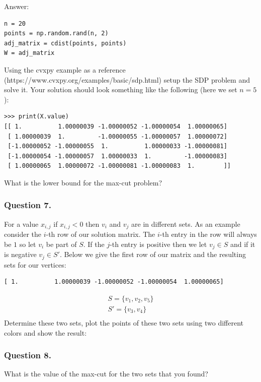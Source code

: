 \documentclass{article}
\begin{document}
Answer:
\begin{verbatim}
n = 20
points = np.random.rand(n, 2)
adj_matrix = cdist(points, points)
W = adj_matrix
\end{verbatim}

Using the cvxpy example as a reference (https://www.cvxpy.org/examples/basic/sdp.html) setup the SDP problem and solve it.
Your solution should look something like the following (here we set \( n = 5 \)):

\begin{verbatim}
>>> print(X.value)
[[ 1.          1.00000039 -1.00000052 -1.00000054  1.00000065]
 [ 1.00000039  1.         -1.00000055 -1.00000057  1.00000072]
 [-1.00000052 -1.00000055  1.          1.00000033 -1.00000081]
 [-1.00000054 -1.00000057  1.00000033  1.         -1.00000083]
 [ 1.00000065  1.00000072 -1.00000081 -1.00000083  1.        ]]
\end{verbatim}

What is the lower bound for the max-cut problem?

\subsubsection{Question 7.}
For a value \( x_{i, j} \) if \( x_{i, j} < 0 \) then \( v_i \) and \( v_j \) are in different sets.
As an example consider the \( i \)-th row of our solution matrix.
The \( i \)-th entry in the row will always be \( 1 \) so let \( v_i \) be part of \( S \).
If the \( j \)-th entry is positive then we let \( v_j \in S \) and if it is negative \( v_j \in S' \).
Below we give the first row of our matrix and the resulting sets for our vertices:
\begin{verbatim}
[ 1.          1.00000039 -1.00000052 -1.00000054  1.00000065]
\end{verbatim}
\begin{gather*}
S = \{ v_1, v_2, v_5 \} \\
S' = \{ v_3, v_4 \} \\
\end{gather*}
Determine these two sets, plot the points of these two sets using two different colors and show the result:

\subsubsection{Question 8.}
What is the value of the max-cut for the two sets that you found?
\end{document}
